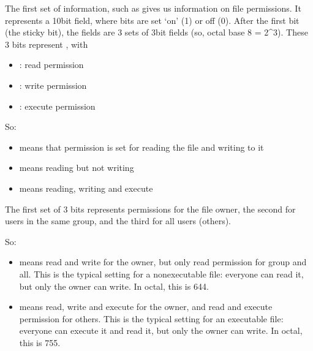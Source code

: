 \documentclass[letterpaper,10pt,english]{sphinxmanual}
\begin{document}
The first set of information, such as  gives us information on file permissions. It represents a 10\sphinxhyphen{}bit field, where bits are set ‘on’ (1) or off (0). After the first bit (the sticky bit), the fields are 3 sets of 3\sphinxhyphen{}bit fields (so, octal \sphinxhyphen{} base 8 = 2\textasciicircum{}3). These 3 bits represent , with
\begin{itemize}
\item {} 
: read permission

\item {} 
: write permission

\item {} 
: execute permission

\end{itemize}

So:
\begin{itemize}
\item {} 
 means that permission is set for reading the file and writing to it

\item {} 
 means reading but not writing

\item {} 
 means reading, writing and execute

\end{itemize}

The first set of 3 bits represents permissions for the file owner, the second for users in the same group, and the third for all users (others).

So:
\begin{itemize}
\item {} 
 means read and write for the owner, but only read permission for group and all. This is the typical setting for a non\sphinxhyphen{}executable file: everyone can read it, but only the owner can write. In octal, this is 644.

\item {} 
 means read, write and execute for the owner, and read and execute permission for others. This is the typical setting for an executable file: everyone can execute it and read it, but only the owner can write. In octal, this is 755.

\end{itemize}
\end{document}

